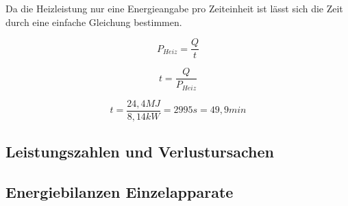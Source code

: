 Da die Heizleistung nur eine Energieangabe pro Zeiteinheit ist lässt sich die Zeit durch eine einfache Gleichung bestimmen.

\begin{equation}
    P_{Heiz}= \frac{Q}{t}
\end{equation}

\begin{equation}
 t = \frac{Q}{P_{Heiz}}
\end{equation}

$$ t= \frac{24,4 MJ}{8,14 kW}=2995 s= 49,9 min$$

\subsection{Leistungszahlen und Verlustursachen}

\subsection{Energiebilanzen Einzelapparate}

